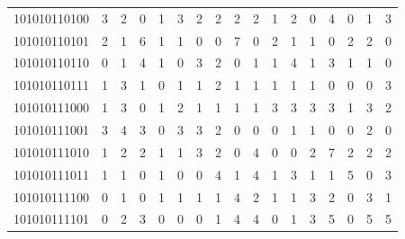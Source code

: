 \documentclass[10pt,a4paper]{article}
\begin{document}
\begin{longtable}{ |c|c|c|c|c|c|c|c|c|c|c|c|c|c|c|c|c| }
    101010110100              & 3                            & 2                                & 0                            & 1                              & 3   & 2   & 2   & 2   & 2   & 1   & 2   & 0   & 4   & 0   & 1   & 3   \\
    101010110101              & 2                            & 1                                & 6                            & 1                              & 1   & 0   & 0   & 7   & 0   & 2   & 1   & 1   & 0   & 2   & 2   & 0   \\
    101010110110              & 0                            & 1                                & 4                            & 1                              & 0   & 3   & 2   & 0   & 1   & 1   & 4   & 1   & 3   & 1   & 1   & 0   \\
    101010110111              & 1                            & 3                                & 1                            & 0                              & 1   & 1   & 2   & 1   & 1   & 1   & 1   & 1   & 0   & 0   & 0   & 3   \\
    101010111000              & 1                            & 3                                & 0                            & 1                              & 2   & 1   & 1   & 1   & 1   & 3   & 3   & 3   & 3   & 1   & 3   & 2   \\
    101010111001              & 3                            & 4                                & 3                            & 0                              & 3   & 3   & 2   & 0   & 0   & 0   & 1   & 1   & 0   & 0   & 2   & 0   \\
    101010111010              & 1                            & 2                                & 2                            & 1                              & 1   & 3   & 2   & 0   & 4   & 0   & 0   & 2   & 7   & 2   & 2   & 2   \\
    101010111011              & 1                            & 1                                & 0                            & 1                              & 0   & 0   & 4   & 1   & 4   & 1   & 3   & 1   & 1   & 5   & 0   & 3   \\
    101010111100              & 0                            & 1                                & 0                            & 1                              & 1   & 1   & 1   & 4   & 2   & 1   & 1   & 3   & 2   & 0   & 3   & 1   \\
    101010111101              & 0                            & 2                                & 3                            & 0                              & 0   & 0   & 1   & 4   & 4   & 0   & 1   & 3   & 5   & 0   & 5   & 5   \\

\end{longtable}
\end{document}
